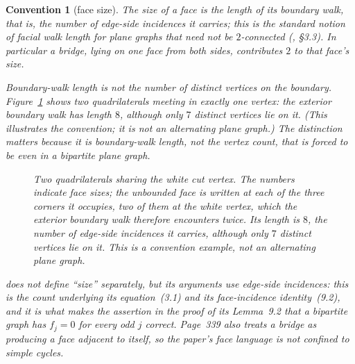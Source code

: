 \documentclass{baustms}
\theoremstyle{cupthm}
\theoremstyle{cupdefn}
\newtheorem{convention}[theorem]{Convention}
\theoremstyle{cuprem}
\begin{document}
\begin{convention}[face size]\label{conv:c1}
The \emph{size} of a face is the length of its boundary walk, that is, the number
of edge-side incidences it carries; this is the standard notion of facial walk
length for plane graphs that need not be $2$-connected
(\cite{MT2001}, \S3.3). In particular a bridge, lying on one face
from both sides, contributes $2$ to that face's size.

Boundary-walk length is not the number of distinct vertices on the boundary.
Figure~\ref{fig:conv} shows two quadrilaterals meeting in exactly one vertex:
the exterior boundary walk has length $8$, although only $7$ distinct vertices
lie on it. (This illustrates the convention; it is not an alternating plane
graph.) The distinction matters because it is boundary-walk length, not the
vertex count, that is forced to be even in a bipartite plane graph.

\begin{figure}[ht]
\centering
{}
\caption{Two quadrilaterals sharing the white cut vertex. The numbers indicate
face sizes; the unbounded face is written at each of the three corners it
occupies, two of them at the white vertex, which the exterior boundary walk
therefore encounters twice. Its length is $8$, the number of edge-side
incidences it carries, although only $7$ distinct vertices lie on it. This is a
convention example, not an alternating plane graph.}\label{fig:conv}
\end{figure}

\cite{AHSSV2015} does not define ``size'' separately, but its arguments use
edge-side incidences: this is the count underlying its equation~(3.1) and its
face-incidence identity~(9.2), and it is what makes the assertion in the proof of
its Lemma~9.2 that a bipartite graph has $f_j = 0$ for every odd $j$ correct.
Page~339 also treats a bridge as producing a face adjacent to itself, so the
paper's face language is not confined to simple cycles.
\end{convention}
\end{document}
